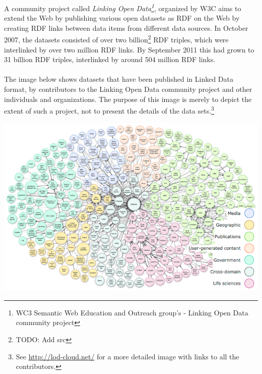 A community project called \textit{Linking Open Data\footnote{WC3 Semantic Web Education and Outreach group's - Linking Open Data community project}}, organized by W3C aims to extend the Web by publishing various open datasets as RDF on the Web by creating RDF links between data items from different data sources. In October 2007, the datasets consisted of over two billion\footnote{TODO: Add src} RDF triples, which were interlinked by over two million RDF links. By September 2011 this had grown to 31 billion RDF triples, interlinked by around 504 million RDF links.\\\\
The image below shows datasets that have been published in Linked Data format, by contributors to the Linking Open Data community project and other individuals and organizations. The purpose of this image is merely to depict the extent of such a project, not to present the details of the data sets.\footnote{See \url{http://lod-cloud.net/} for a more detailed image with links to all the contributors.}
\begin{center}
\includegraphics[scale=0.6]{../imgs/lod-datasets.png}
\end{center}

